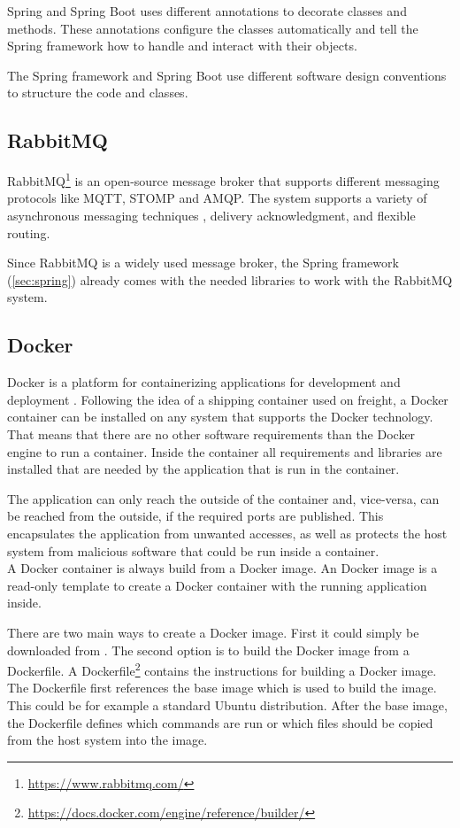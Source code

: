 Spring and Spring Boot uses different annotations to decorate classes and methods.
These annotations configure the classes automatically and tell the Spring framework how to handle and interact with their objects.

The Spring framework and Spring Boot use different software design conventions to structure the code and classes.


\subsection{RabbitMQ}
\label{sec:rabbitmq}
RabbitMQ\footnote{\url{https://www.rabbitmq.com/}} is an open-source message broker that supports different messaging protocols like MQTT, STOMP and AMQP.
The system supports a variety of asynchronous messaging techniques \eg, delivery acknowledgment, and flexible routing.

Since RabbitMQ is a widely used message broker, the Spring framework (\ref{sec:spring}) already comes with the needed libraries to work with the RabbitMQ system.


\subsection{Docker}
Docker is a platform for containerizing applications for development and deployment \cite{DockerOverviewHttps2022}.
Following the idea of a shipping container used on freight, a Docker container can be installed on any system that supports the Docker technology.
That means that there are no other software requirements than the Docker engine to run a container.
Inside the container all requirements and libraries are installed that are needed by the application that is run in the container.

The application can only reach the outside of the container and, vice-versa, can be reached from the outside, if the required ports are published.
This encapsulates the application from unwanted accesses, as well as protects the host system from malicious software that could be run inside a container.
\\

A Docker container is always build from a Docker image.
An Docker image is a read-only template to create a Docker container with the running application inside.

There are two main ways to create a Docker image.
First it could simply be downloaded from \dockh{}.
The second option is to build the Docker image from a Dockerfile.
A Dockerfile\footnote{\url{https://docs.docker.com/engine/reference/builder/}} contains the instructions for building a Docker image.
The Dockerfile first references the base image which is used to build the image.
This could be for example a standard Ubuntu distribution.
After the base image, the Dockerfile defines which commands are run or which files should be copied from the host system into the image.

